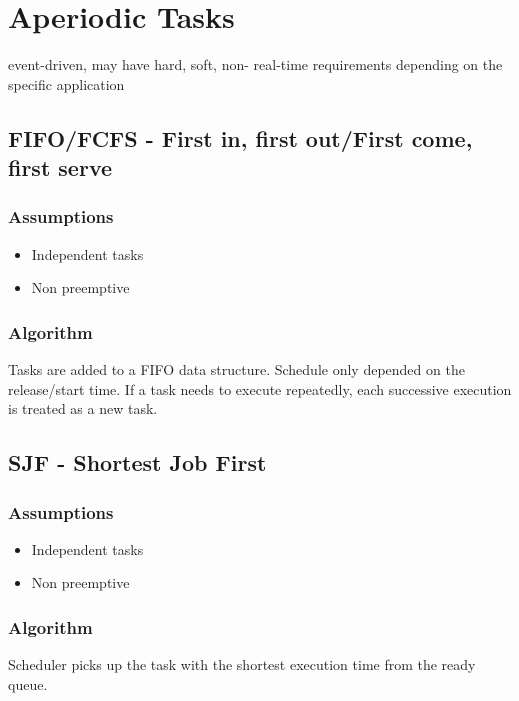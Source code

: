 


\section{Aperiodic Tasks}

event-driven, may have hard, soft, non-
real-time requirements depending on the specific 
application

\subsection{FIFO/FCFS - First in, first out/First come, first serve}

\subsubsection{Assumptions}
\begin{itemize}[noitemsep]
\item Independent tasks
\item Non preemptive
\end{itemize}

\subsubsection{Algorithm}
Tasks are added to a FIFO data structure. Schedule only depended on the release/start time. If a task needs to execute repeatedly, each successive execution is treated as a new task.


\subsection{SJF - Shortest Job First}

\subsubsection{Assumptions}
\begin{itemize}[noitemsep]
\item Independent tasks
\item Non preemptive
\end{itemize}

\subsubsection{Algorithm}
Scheduler picks up the task with the shortest execution time from the ready queue.

